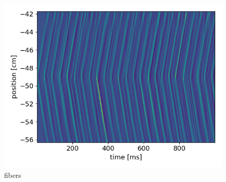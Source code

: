 
\begin{figure}[H]
  \centering%
  \includegraphics[width=\textwidth]{images/results/application/fibers_plot.png}%
  \caption{fibers}%
  \label{fig:fibers_plot}%
\end{figure}

